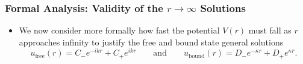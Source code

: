 \documentclass[11pt, a4paper]{article}
\newcommand{\eqtext}[1]{\qquad \text{#1} \qquad}
\begin{document}
\subsubsection{Formal Analysis: Validity of the $ r \to \infty $ Solutions}
\begin{itemize}

	\item We now consider more formally how fast the potential $ V(r) $ must fall as $ r $ approaches infinity to justify the free and bound state general solutions
	\begin{equation*}
		u_{\text{free}}(r) = C_{-}e^{-i k r} + C_{+}e^{i k r}\eqtext{and} u_{\text{bound}}(r) = D_{-}e^{-\kappa r} + D_{+}e^{\kappa r}.
	\end{equation*}

\end{itemize}
\end{document}
